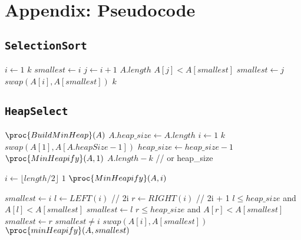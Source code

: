 \documentclass[acmconf,nonacm=true]{acmart}
\begin{document}
\section{Appendix: Pseudocode} \label{Appendix}
\begin{multicols}{2}
\subsection{\texttt{SelectionSort}}
\begin{codebox}
\li \For $i \gets 1$ \To $k$
\li \Do $smallest \gets i$
\li     \For $j \gets i + 1$ \To $A.length$
\li     \Do \If $A[j] < A[smallest]$
\li         \Then $smallest \gets j$
            \End
        \End
\li     $swap(A[i], A[smallest])$
    \End
\li \Return $k$
\End
\end{codebox}

\subsection{\texttt{HeapSelect}}

\begin{codebox}
\li $\proc{BuildMinHeap}(A)$
\li $A.heap\_size \gets A.length$
\li \For $i \gets 1$ \To $k$
\li \Do $swap(A[1], A[A.heapSize - 1])$
\li     $heap\_size \gets heap\_size - 1$
\li     $\proc{MinHeapify}(A, 1)$
    \End
\li \Return $A.length - k$ // or heap\_size
\End
\end{codebox}


\begin{codebox}
\li \For $i \gets \lfloor length/2 \rfloor$ \Downto $1$
\li \Do $\proc{MinHeapify}(A, i)$
    \End
\End
\end{codebox}




\begin{codebox}
\li $smallest \gets i$
\li $l \gets LEFT(i)$ // 2i
\li $r \gets RIGHT(i)$ // 2i + 1
\li \If $l \leq heap\_size$ and $A[l] < A[smallest]$
\li \Then $smallest \gets l$
    \End
\li \If $r \leq heap\_size$ and $A[r] < A[smallest]$
\li \Then $smallest \gets r$
    \End
\li \If $smallest \neq i$
\li \Then $swap(A[i], A[smallest])$
\li     $\proc{minHeapify}(A, smallest)$
    \End
\End
\end{codebox}



\end{multicols}
\end{document}
